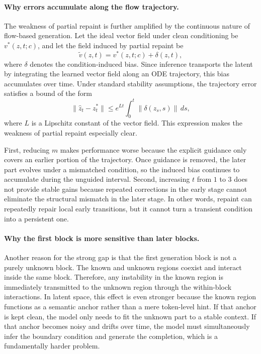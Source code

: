 \paragraph{Why errors accumulate along the flow trajectory.}
The weakness of partial repaint is further amplified by the continuous nature of flow-based generation. Let the ideal vector field under clean conditioning be \(v^*(z,t;c)\), and let the field induced by partial repaint be
\[
\tilde v(z,t) = v^*(z,t;c) + \delta(z,t),
\]
where \(\delta\) denotes the condition-induced bias. Since inference transports the latent by integrating the learned vector field along an ODE trajectory, this bias accumulates over time. Under standard stability assumptions, the trajectory error satisfies a bound of the form
\[
\|\hat z_t - z_t^*\|
\le
e^{Lt}\int_0^t \|\delta(z_s,s)\|\, ds,
\]
where \(L\) is a Lipschitz constant of the vector field. This expression makes the weakness of partial repaint especially clear.

First, reducing \(m\) makes performance worse because the explicit guidance only covers an earlier portion of the trajectory. Once guidance is removed, the later part evolves under a mismatched condition, so the induced bias continues to accumulate during the unguided interval. Second, increasing \(t\) from \(1\) to \(3\) does not provide stable gains because repeated corrections in the early stage cannot eliminate the structural mismatch in the later stage. In other words, repaint can repeatedly repair local early transitions, but it cannot turn a transient condition into a persistent one.

\paragraph{Why the first block is more sensitive than later blocks.}
Another reason for the strong gap is that the first generation block is not a purely unknown block. The known and unknown regions coexist and interact inside the same block. Therefore, any instability in the known region is immediately transmitted to the unknown region through the within-block interactions. In latent space, this effect is even stronger because the known region functions as a semantic anchor rather than a mere token-level hint. If that anchor is kept clean, the model only needs to fit the unknown part to a stable context. If that anchor becomes noisy and drifts over time, the model must simultaneously infer the boundary condition and generate the completion, which is a fundamentally harder problem.

